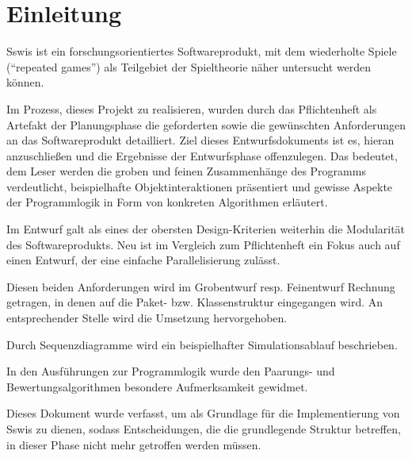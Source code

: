 \section{Einleitung}

Sswis ist ein forschungsorientiertes Softwareprodukt, mit dem wiederholte Spiele ("`repeated games"') als Teilgebiet der Spieltheorie näher untersucht werden können.

Im Prozess, dieses Projekt zu realisieren, wurden durch das Pflichtenheft als Artefakt der Planungsphase die geforderten sowie die gewünschten Anforderungen an das Softwareprodukt detailliert. Ziel dieses Entwurfsdokuments ist es, hieran anzuschließen und die Ergebnisse der Entwurfsphase offenzulegen. Das bedeutet, dem Leser werden die groben und feinen Zusammenhänge des Programms verdeutlicht, beispielhafte Objektinteraktionen präsentiert und gewisse Aspekte der Programmlogik in Form von konkreten Algorithmen erläutert.

Im Entwurf galt als eines der obersten Design-Kriterien weiterhin die Modularität des Softwareprodukts. Neu ist im Vergleich zum Pflichtenheft ein Fokus auch auf einen Entwurf, der eine einfache Parallelisierung zulässt.

Diesen beiden Anforderungen wird im Grobentwurf resp. Feinentwurf Rechnung getragen, in denen auf die Paket- bzw. Klassenstruktur eingegangen wird. An entsprechender Stelle wird die Umsetzung hervorgehoben.

Durch Sequenzdiagramme wird ein beispielhafter Simulationsablauf beschrieben.

In den Ausführungen zur Programmlogik wurde den Paarungs- und Bewertungsalgorithmen besondere Aufmerksamkeit gewidmet.

Dieses Dokument wurde verfasst, um als Grundlage für die Implementierung von Sswis zu dienen, sodass Entscheidungen, die die grundlegende Struktur betreffen, in dieser Phase nicht mehr getroffen werden müssen.